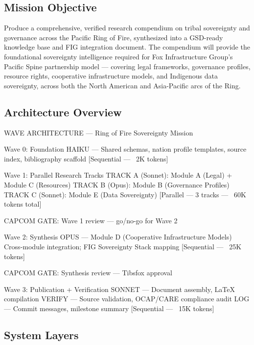 \documentclass[11pt,letterpaper]{article}
\begin{document}
\subsection{Mission Objective}

Produce a comprehensive, verified research compendium on tribal sovereignty and governance across the Pacific Ring of Fire, synthesized into a GSD-ready knowledge base and FIG integration document. The compendium will provide the foundational sovereignty intelligence required for Fox Infrastructure Group's Pacific Spine partnership model --- covering legal frameworks, governance profiles, resource rights, cooperative infrastructure models, and Indigenous data sovereignty, across both the North American and Asia-Pacific arcs of the Ring.

\subsection{Architecture Overview}

\begin{asciibox}
WAVE ARCHITECTURE — Ring of Fire Sovereignty Mission

Wave 0: Foundation
    HAIKU — Shared schemas, nation profile templates,
             source index, bibliography scaffold
    [Sequential — ~2K tokens]

Wave 1: Parallel Research Tracks
    TRACK A (Sonnet): Module A (Legal) + Module C (Resources)
    TRACK B (Opus):   Module B (Governance Profiles)
    TRACK C (Sonnet): Module E (Data Sovereignty)
    [Parallel — 3 tracks — ~60K tokens total]

    CAPCOM GATE: Wave 1 review — go/no-go for Wave 2

Wave 2: Synthesis
    OPUS — Module D (Cooperative Infrastructure Models)
            Cross-module integration; FIG Sovereignty Stack mapping
    [Sequential — ~25K tokens]

    CAPCOM GATE: Synthesis review — Tibsfox approval

Wave 3: Publication + Verification
    SONNET — Document assembly, LaTeX compilation
    VERIFY  — Source validation, OCAP/CARE compliance audit
    LOG     — Commit messages, milestone summary
    [Sequential — ~15K tokens]
\end{asciibox}

\subsection{System Layers}
\end{document}
